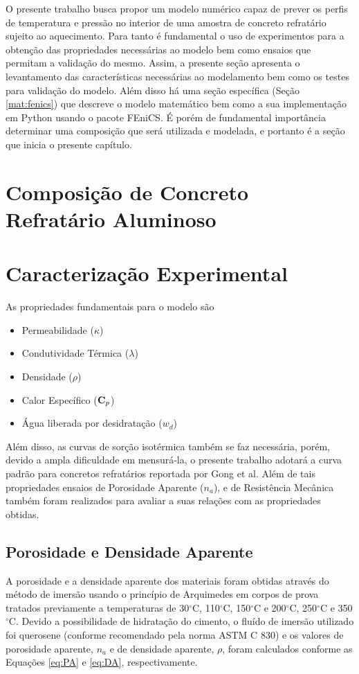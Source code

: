O presente trabalho busca propor um modelo numérico capaz de prever os perfis de
temperatura e pressão no interior de uma amostra de concreto refratário sujeito
ao aquecimento. Para tanto é fundamental o uso de experimentos para a obtenção
das propriedades necessárias ao modelo bem como ensaios que permitam a validação
do mesmo. Assim, a presente seção apresenta o levantamento das características
necessárias ao modelamento bem como os testes para validação do modelo. Além
disso há uma seção específica (Seção \ref{mat:fenics}) que descreve o modelo
matemático bem como a sua implementação em Python usando o pacote FEniCS. É
porém de fundamental importância determinar uma composição que será utilizada
e modelada, e portanto é a seção que inicia o presente capítulo.

\section{Composição de Concreto Refratário Aluminoso}

        
\section{Caracterização Experimental}\label{mat:exp}
As propriedades fundamentais para o modelo são

\begin{itemize}
\item Permeabilidade ($\kappa$)
\item Condutividade Térmica ($\lambda$)
\item Densidade ($\rho$)
\item Calor Específico ($\bm{\mathrm{C}}_p$)
\item Água liberada por desidratação ($w_d$)
\end{itemize}

Além disso, as curvas de sorção isotérmica também se faz necessária, porém,
devido a ampla dificuldade em mensurá-la, o presente trabalho adotará a curva
padrão para concretos refratários reportada por Gong et al\cite{Gong1995a}. Além
de tais propriedades ensaios de Porosidade Aparente ($n_a$), e de Resistência
Mecânica também foram realizados para avaliar a suas relações com as
propriedades obtidas.

    \subsection{Porosidade e Densidade Aparente}\label{mat:porosidade}
    A porosidade e a densidade aparente dos materiais foram obtidas através do
    método de imersão usando o princípio de Arquimedes em corpos de prova
    tratados previamente a temperaturas de 30$^\circ$C, 110$^\circ$C,
    150$^\circ$C e 200$^\circ$C, 250$^\circ$C e 350$^\circ$C. Devido a
    possibilidade de hidratação do cimento, o fluído de imersão utilizado foi
    querosene (conforme recomendado pela norma ASTM C 830) e os valores de
    porosidade aparente, $n_a$ e de densidade aparente, $\rho$, foram calculados
    conforme as Equações \ref{eq:PA} e \ref{eq:DA}, respectivamente.

